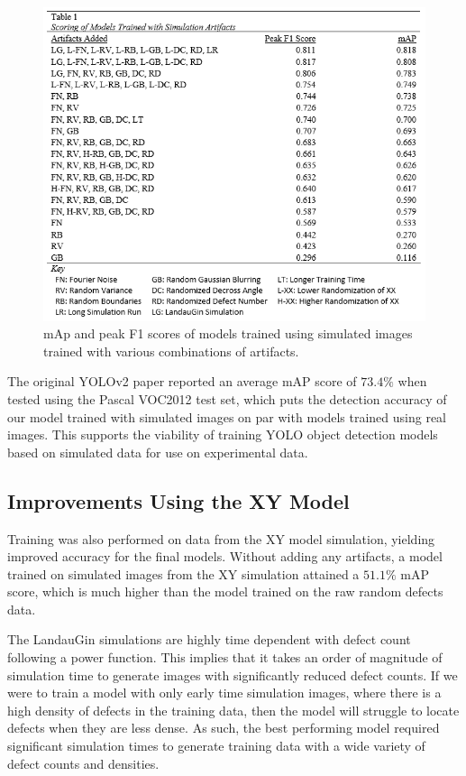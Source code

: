 \documentclass[prl,reprint,showpacs,floatfix,nofootinbib]{revtex4-1}
\begin{document}
\begin{figure}
  \includegraphics[width=\linewidth]{modelTable.PNG}
  \caption{mAp and peak F1 scores of models trained using simulated images trained with various combinations of artifacts.}
  \label{fig:frames}
\end{figure}

The original YOLOv2 paper reported an average mAP score of $73.4\%$ when tested using the Pascal VOC2012 test set, which puts the detection accuracy of our model trained with simulated images on par with models trained using real images. 
This supports the viability of training YOLO object detection models based on simulated data for use on experimental data.

\subsection{Improvements Using the XY Model}
Training was also performed on data from the XY model simulation, yielding improved accuracy for the final models. Without adding any artifacts, a model trained on simulated images from the XY simulation attained a $51.1\%$ mAP score, which is much higher than the model trained on the raw random defects data. 


The LandauGin simulations are highly time dependent with defect count following a power function. This implies that it takes an order of magnitude of simulation time to generate images with significantly reduced defect counts. If we were to train a model with only early time simulation images, where there is a high density of defects in the training data, then the model will struggle to locate defects when they are less dense. As such, the best performing model required significant simulation times to generate training data with a wide variety of defect counts and densities. 
\end{document}
